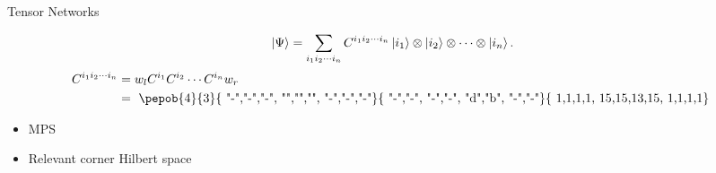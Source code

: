 \begin{frame}{Tensor Networks}

    \begin{equation}
        \ket{\Psi} = \sum_{i_1 i_2 \cdots i_n } C^{i_1 i_2 \cdots i_n} \ket{i_1} \otimes \ket{i_2} \otimes \cdots \otimes \ket{i_n}.
    \end{equation}
    \begin{equation}
        \begin{split}
            C^{i_1 i_2 \cdots i_n} &= w_l C^{i_1} C^{i_2} \cdots C^{i_n} w_r \\
            &=  \vcenter{ \hbox{ \pepob{4}{3}{{
                                "-","-","-",
                                "","","",
                                "-","-","-"}}{{
                                "-","-",
                                "-","-",
                                "d","b",
                                "-","-"}}{{
                                1,1,1,1,
                                15,15,13,15,
                                1,1,1,1}} }}
        \end{split}
    \end{equation}

    \begin{itemize}
        \item MPS
        \item Relevant corner Hilbert space
    \end{itemize}
\end{frame}


